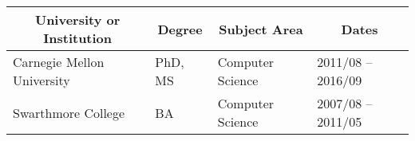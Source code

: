 \documentclass[10pt]{article}
\begin{document}
\vspace{-30pt}
\noindent\vspace{-2em}
\begin{table}[h!]
  \begin{tabular}{ p{} p{} p{} p{} }
    \toprule
    \multicolumn{1}{c}{\bf University or Institution} & \multicolumn{1}{c}{\bf Degree} & \multicolumn{1}{c}{\bf Subject Area}            & \multicolumn{1}{c}{\bf Dates} \\
    \midrule
    Carnegie Mellon University & PhD, MS & Computer Science & 2011/08 -- 2016/09 \\
    Swarthmore College         & BA       & Computer Science & 2007/08 -- 2011/05 \\
    \bottomrule
  \end{tabular}
\end{table}


\end{document}
